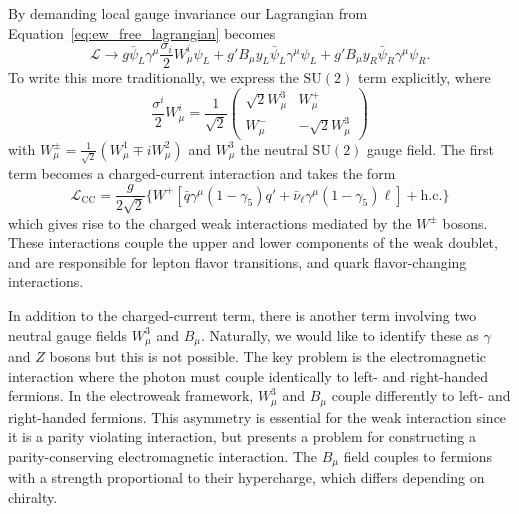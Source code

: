 By demanding local gauge invariance our Lagrangian from Equation~\ref{eq:ew_free_lagrangian} becomes 
\begin{equation}
  \mathcal{L} \to g\bar{\psi}_{L}\gamma^{\mu}\frac{\sigma_{i}}{2}W_{\mu}^{i}\psi_{L} + g'B_{\mu}y_{L}\bar{\psi}_{L}\gamma^{\mu}\psi_{L} + g'B_{\mu}y_{R}\bar{\psi}_{R}\gamma^{\mu}\psi_{R}.
  \label{eq:ew_lagrangian}
\end{equation}
To write this more traditionally, we express the $\mathrm{SU}(2)$ term explicitly, where
\begin{equation}
  \frac{\sigma^{i}}{2}W_{\mu}^{i} = \frac{1}{\sqrt{2}}\begin{pmatrix}
    \sqrt{2}W_{\mu}^{3} &  W_{\mu}^{+} \\
    W_{\mu}^{-} & -\sqrt{2}W_{\mu}^{3}
  \end{pmatrix}
\end{equation}
with $W_{\mu}^{\pm} = \frac{1}{\sqrt{2}}(W_{\mu}^{1} \mp iW_{\mu}^{2})$ and $W_{\mu}^{3}$ the neutral $\mathrm{SU}(2)$ gauge field. The first term becomes a charged-current interaction and takes the form
\begin{equation}
  \mathcal{L}_{\mathrm{CC}} = \frac{g}{2\sqrt{2}}\{W^{+}[\bar{q}\gamma^{\mu}(1-\gamma_{5})q' + \bar{\nu}_{\ell}\gamma^{\mu}(1 - \gamma_{5})\ell] + \mathrm{h.c.}\}
  \label{eq:ew_cc_lagrangian}
\end{equation}
which gives rise to the charged weak interactions mediated by the $W^{\pm}$ bosons. These interactions couple the upper and lower components of the weak doublet, and are responsible for lepton flavor transitions, and quark flavor-changing interactions. 

In addition to the charged-current term, there is another term involving two neutral gauge fields $W^{3}_{\mu}$ and $B_{\mu}$. Naturally, we would like to identify these as $\gamma$ and $Z$ bosons but this is not possible. The key problem is the electromagnetic interaction where the photon must couple identically to left- and right-handed fermions. In the electroweak framework, $W^{3}_{\mu}$ and $B_{\mu}$ couple differently to left- and right-handed fermions. This asymmetry is essential for the weak interaction since it is a parity violating interaction, but presents a problem for constructing a parity-conserving electromagnetic interaction. The $B_{\mu}$ field couples to fermions with a strength proportional to their hypercharge, which differs depending on chiralty. 

